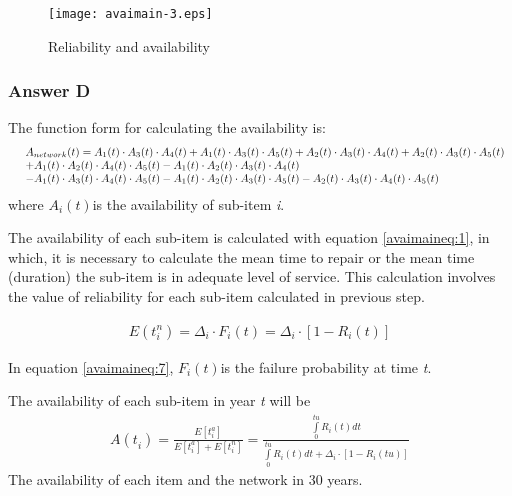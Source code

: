 \begin{figure}[h]
\texttt{[image: avaimain-3.eps]}
\caption{Reliability and availability}\label{avaimain:3}
\end{figure}
\subsubsection{Answer D}
The function form for calculating the availability is:
\begin{eqnarray}
&& \begin{array}{l}
{A_{network}}(t) = {A_1}(t) \cdot {A_3}(t) \cdot {A_4}(t) + {A_1}(t) \cdot
{A_3}(t) \cdot {A_5}(t) + {A_2}(t) \cdot {A_3}(t) \cdot {A_4}(t) + {A_2}(t) \cdot
{A_3}(t) \cdot {A_5}(t)\\
+ {A_1}(t) \cdot {A_2}(t) \cdot {A_4}(t) \cdot {A_5}(t){\rm{ }} - {A_1}(t)
\cdot {A_2}(t) \cdot {A_3}(t) \cdot {A_4}(t)\\
- {A_1}(t) \cdot {A_3}(t) \cdot {A_4}(t) \cdot {A_5}(t) - {A_1}(t) \cdot
{A_2}(t) \cdot {A_3}(t) \cdot {A_5}(t) - {A_2}(t) \cdot {A_3}(t) \cdot {A_4}(t)
\cdot {A_5}(t)
\end{array}
\label{avaimaineq:6}
\end{eqnarray}
where ${A_i}(t)$is the availability of sub-item \textit{i}.

The availability of each sub-item is calculated with equation \eqref{avaimaineq:1}, in which, it
is necessary to calculate the mean time to repair or the mean time (duration) the
sub-item is in adequate level of service. This calculation involves the value of
reliability for each sub-item calculated in previous step.

\begin{eqnarray}
E(t_i^n) = {\Delta _i} \cdot {F_i}(t) = {\Delta _i} \cdot \left[ {1 - {R_i}(t)}
\right]
\label{avaimaineq:7}
\end{eqnarray}


In equation \eqref{avaimaineq:7}, ${F_i}(t)$is the failure probability at time \textit{t}.

The availability of each sub-item in year \textit{t} will be
\begin{eqnarray}
A(t_i^{}) = \frac{{E\left[ {t_i^a} \right]}}{{E\left[ {t_i^a} \right] + E\left[
{t_i^n} \right]}} = \frac{{\int\limits_0^{tu} {{R_i}(t)dt} }}{{\int\limits_0^{tu}
{{R_i}(t)dt}  + {\Delta _i} \cdot \left[ {1 - {R_i}(tu)} \right]}}
\label{avaimaineq:8}
\end{eqnarray}
The availability of each item and the network in 30 years.

